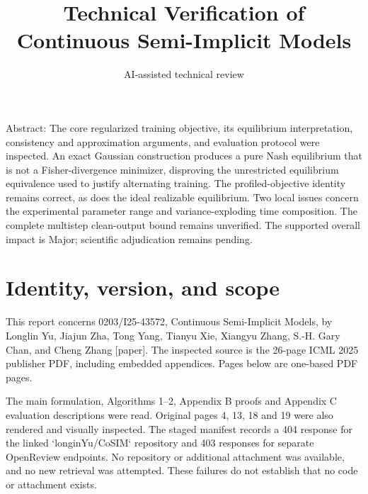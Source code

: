 \documentclass[10pt]{article}
\title{Technical Verification of Continuous Semi-Implicit Models}
\author{AI-assisted technical review}
\date{}
\begin{document}
\maketitle
Abstract: The core regularized training objective, its equilibrium interpretation, consistency and approximation arguments, and evaluation protocol were inspected. An exact Gaussian construction produces a pure Nash equilibrium that is not a Fisher-divergence minimizer, disproving the unrestricted equilibrium equivalence used to justify alternating training. The profiled-objective identity remains correct, as does the ideal realizable equilibrium. Two local issues concern the experimental parameter range and variance-exploding time composition. The complete multistep clean-output bound remains unverified. The supported overall impact is Major; scientific adjudication remains pending.\par
\section*{Identity, version, and scope}
This report concerns 0203/I25-43572, Continuous Semi-Implicit Models, by Longlin Yu, Jiajun Zha, Tong Yang, Tianyu Xie, Xiangyu Zhang, S.-H. Gary Chan, and Cheng Zhang [paper]. The inspected source is the 26-page ICML 2025 publisher PDF, including embedded appendices. Pages below are one-based PDF pages.\par
The main formulation, Algorithms 1–2, Appendix B proofs and Appendix C evaluation descriptions were read. Original pages 4, 13, 18 and 19 were also rendered and visually inspected. The staged manifest records a 404 response for the linked `longinYu/CoSIM` repository and 403 responses for separate OpenReview endpoints. No repository or additional attachment was available, and no new retrieval was attempted. These failures do not establish that no code or attachment exists.\par
\end{document}
